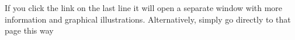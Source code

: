 If you click the link on the last line it will open a separate window with more information and graphical illustrations.
Alternatively, simply go directly to that page this way
